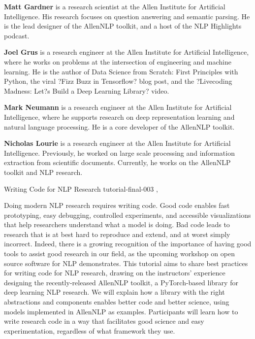 \begin{bio}
\textbf{Matt Gardner} is a research scientist at the Allen
Institute for Artificial Intelligence. His research
focuses on question answering and semantic parsing.
He is the lead designer of the AllenNLP
toolkit, and a host of the NLP Highlights podcast.

\textbf{Joel Grus} is a research engineer at the Allen Institute for Artificial Intelligence, where he works
on problems at the intersection of engineering and
machine learning. He is the author of Data Science
from Scratch: First Principles with Python,
the viral ?Fizz Buzz in Tensorflow? blog post,
and the ?Livecoding Madness: Let?s Build a Deep
Learning Library? video.

\textbf{Mark Neumann} is a research engineer at the
Allen Institute for Artificial Intelligence, where he
supports research on deep representation learning
and natural language processing. He is a core developer
of the AllenNLP toolkit.

\textbf{Nicholas Lourie} is a research engineer at the
Allen Institute for Artificial Intelligence. Previously,
he worked on large scale processing and
information extraction from scientific documents.
Currently, he works on the AllenNLP toolkit and
NLP research.

\end{bio}

\begin{tutorial}
  {Writing Code for NLP Research}
  {tutorial-final-003}
  {, \tutorialafternoontime}
  {\TutLocC}

Doing modern NLP research requires writing code. Good code enables fast prototyping, easy debugging, controlled experiments, and accessible visualizations that help researchers understand what a model is doing. Bad code leads to research that is at best hard to reproduce and extend, and at worst simply incorrect. Indeed, there is a growing recognition of the importance of having good tools to assist good research in our field, as the upcoming workshop on open source software for NLP demonstrates. This tutorial aims to share best practices for writing code for NLP research, drawing on the instructors' experience designing the recently-released AllenNLP toolkit, a PyTorch-based library for deep learning NLP research. We will explain how a library with the right abstractions and components enables better code and better science, using models implemented in AllenNLP as examples. Participants will learn how to write research code in a way that facilitates good science and easy experimentation, regardless of what framework they use.

\end{tutorial}
